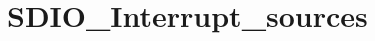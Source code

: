 \hypertarget{group___s_d_i_o___interrupt__sources}{\section{S\-D\-I\-O\-\_\-\-Interrupt\-\_\-sources}
\label{group___s_d_i_o___interrupt__sources}
}
